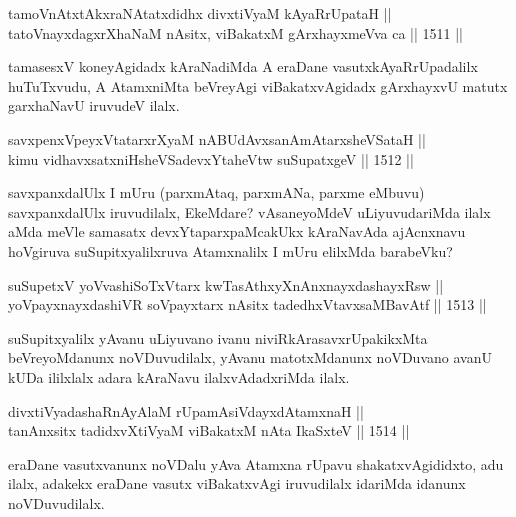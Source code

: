 \begin{shl}
tamoVnAtxtAkxraNAtatxdidhx divxtiVyaM kAyaRrUpataH || \\
tatoV\s nayxdagxrXhaNaM nAsitx, viBakatxM gArxhayxmeVva ca \hfill || 1511 ||  
\end{shl}

\begin{artha}
tamasesxV koneyAgidadx kAraNadiMda A eraDane vasutxkAyaRrUpadalilx huTuTxvudu, A AtamxniMta beVreyAgi viBakatxvAgidadx gArxhayxvU matutx garxhaNavU iruvudeV ilalx.
\end{artha}

\begin{shl}
savxpenxV\s peyxVtatarxrXyaM nABUdAvxsanAmAtarxsheVSataH ||  \\
kimu vidhavxsatxniHsheVSadevxYtaheVtw suSupatxgeV \hfill || 1512 ||  
\end{shl}

\begin{artha}
savxpanxdalUlx I mUru (parxmAtaq, parxmANa, parxme eMbuvu) savxpanxdalUlx iruvudilalx, EkeMdare? vAsaneyoMdeV uLiyuvudariMda ilalx aMda meVle samasatx devxYtaparxpaMcakUkx kAraNavAda ajAcnxnavu hoVgiruva suSupitxyalilxruva Atamxnalilx I mUru elilxMda barabeVku?
\end{artha}

\begin{shl}
suSupetxV yoV\s vashiSoTxV\s tarx kwTasAthxyXnAnxnayxdashayxRsw || \\
yoV\s payxnayxdashiVR soV\s payxtarx nAsitx tadedhxVtavxsaMBavAtf \hfill || 1513 ||  
\end{shl}

\begin{artha}
suSupitxyalilx yAvanu uLiyuvano ivanu niviRkArasavxrUpakikxMta beVreyoMdanunx noVDuvudilalx, yAvanu matotxMdanunx noVDuvano avanU kUDa ililxlalx adara kAraNavu ilalxvAdadxriMda ilalx.
\end{artha}

\begin{shl}
divxtiVyadashaRnAyAlaM rUpamAsiVdayxdAtamxnaH || \\
tanAnxsitx tadidxvXtiVyaM viBakatxM nAta IkaSxteV \hfill || 1514 ||  
\end{shl}

\begin{artha}
eraDane vasutxvanunx noVDalu yAva Atamxna rUpavu shakatxvAgididxto, adu ilalx, adakekx eraDane vasutx viBakatxvAgi iruvudilalx idariMda idanunx noVDuvudilalx.
\end{artha}

